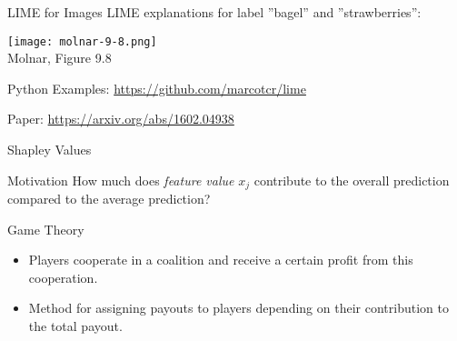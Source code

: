 \documentclass[ignorenonframetext,xcolor=x11names]{beamer}
\begin{document}

        

\begin{frame}{LIME for Images}
LIME explanations for label ''bagel'' and ''strawberries'':
\begin{center}
\texttt{[image: molnar-9-8.png]} \\

\scriptsize Molnar, Figure 9.8
\end{center}
\begin{block}{Python Examples:}
\url{https://github.com/marcotcr/lime}
\end{block}

\begin{block}{Paper:}
\url{https://arxiv.org/abs/1602.04938}
\end{block}
\end{frame}


\begin{frame}{Shapley Values}
\begin{block}{Motivation}
How much does \emph{feature value} $x_j$ contribute to the overall prediction compared to the average prediction?
\end{block}

\begin{block}{Game Theory}
\begin{itemize}
\item Players cooperate in a coalition and receive a certain profit from this cooperation.
\item Method for assigning payouts to players depending on their contribution to the total payout. 
\end{itemize}
\end{block}

\end{frame}
\end{document}
